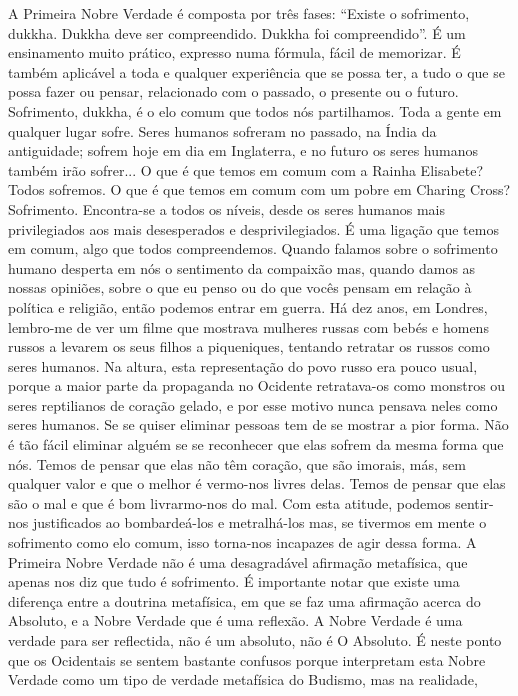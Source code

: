 A Primeira Nobre Verdade é composta por três fases:
“Existe o sofrimento, dukkha. Dukkha deve ser compreendido.
Dukkha foi compreendido”.
É um ensinamento muito prático, expresso numa fórmula,
fácil de memorizar. É também aplicável a toda e qualquer
experiência que se possa ter, a tudo o que se possa fazer ou
pensar, relacionado com o passado, o presente ou o futuro.
Sofrimento, dukkha, é o elo comum que todos nós partilhamos. Toda a gente em qualquer lugar sofre. Seres humanos
sofreram no passado, na Índia da antiguidade; sofrem hoje em
dia em Inglaterra, e no futuro os seres humanos também irão
sofrer... O que é que temos em comum com a Rainha
Elisabete? Todos sofremos. O que é que temos em comum
com um pobre em Charing Cross? Sofrimento. Encontra-se a
todos os níveis, desde os seres humanos mais privilegiados
aos mais desesperados e desprivilegiados. É uma ligação que
temos em comum, algo que todos compreendemos.
Quando falamos sobre o sofrimento humano desperta em
nós o sentimento da compaixão mas, quando damos as nossas
opiniões, sobre o que eu penso ou do que vocês pensam em
relação à política e religião, então podemos entrar em guerra.
Há dez anos, em Londres, lembro-me de ver um filme que
mostrava mulheres russas com bebés e homens russos a
levarem os seus filhos a piqueniques, tentando retratar os
russos como seres humanos. Na altura, esta representação do
povo russo era pouco usual, porque a maior parte da propaganda no Ocidente retratava-os como monstros ou seres
reptilianos de coração gelado, e por esse motivo nunca pensava neles como seres humanos. Se se quiser eliminar pessoas
tem de se mostrar a pior forma. Não é tão fácil eliminar
alguém se se reconhecer que elas sofrem da mesma forma que
nós. Temos de pensar que elas não têm coração, que são
imorais, más, sem qualquer valor e que o melhor é vermo-nos
livres delas. Temos de pensar que elas são o mal e que é bom
livrarmo-nos do mal. Com esta atitude, podemos sentir-nos
justificados ao bombardeá-los e metralhá-los mas, se tivermos
em mente o sofrimento como elo comum, isso torna-nos
incapazes de agir dessa forma.
A Primeira Nobre Verdade não é uma desagradável afirmação metafísica, que apenas nos diz que tudo é sofrimento.
É importante notar que existe uma diferença entre a doutrina
metafísica, em que se faz uma afirmação acerca do Absoluto,
e a Nobre Verdade que é uma reflexão. A Nobre Verdade é
uma verdade para ser reflectida, não é um absoluto, não é O
Absoluto. É neste ponto que os Ocidentais se sentem bastante
confusos porque interpretam esta Nobre Verdade como um
tipo de verdade metafísica do Budismo, mas na realidade,
